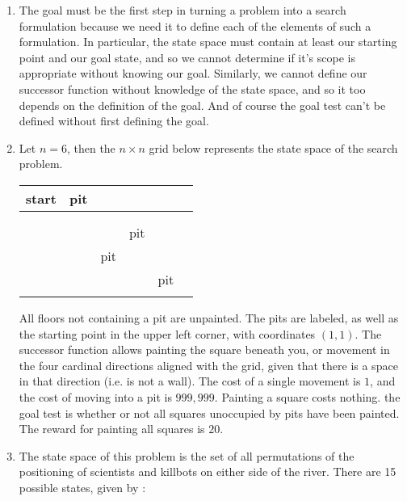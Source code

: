 \documentclass[10pt]{article}
\theoremstyle{plain}
\begin{document}
\maketitle

\begin{enumerate}
\item The goal must be the first step in turning a problem into a search formulation because we need it to define each of the elements of such a formulation. In particular, the state space must contain at least our starting point and our goal state, and so we cannot determine if it's scope is appropriate without knowing our goal. Similarly, we cannot define our successor function without knowledge of the state space, and so it too depends on the definition of the goal. And of course the goal test can't be defined without first defining the goal. 

\item Let $n = 6$, then the $n \times n$ grid below represents the state space of the search problem. 

\begin{center}





\noindent\begin{tabular}{!{\vrule width 2pt}P|P!{\vrule width 0.5pt}P|P|P|P!{\vrule width 2pt}}
start &    pit&  &&&\tabularnewline
\hline
 &  &  & && \tabularnewline
{}
 &  &  & && \tabularnewline
\hline
 &  &  & pit&& \tabularnewline
 \hline
 &  &pit  & && \tabularnewline
 \hline
 &  &   &&pit& \tabularnewline
{}
\end{tabular}
\end{center}

All floors not containing a pit are unpainted. The pits are labeled, as well as the starting point in the upper left corner, with coordinates $(1,1)$. The successor function allows painting the square beneath you, or movement in the four cardinal directions aligned with the grid, given that there is a space in that direction (i.e. is not a wall). The cost of a single movement is $1$, and the cost of moving into a pit is $999,999$. Painting a square costs nothing. the goal test is whether or not all squares unoccupied by pits have been painted. The reward for painting all squares is $20$. 

\item The state space of this problem is the set of all permutations of the positioning of scientists and killbots on either side of the river. There are 15 possible states, given by : 


\end{enumerate}
\end{document}
